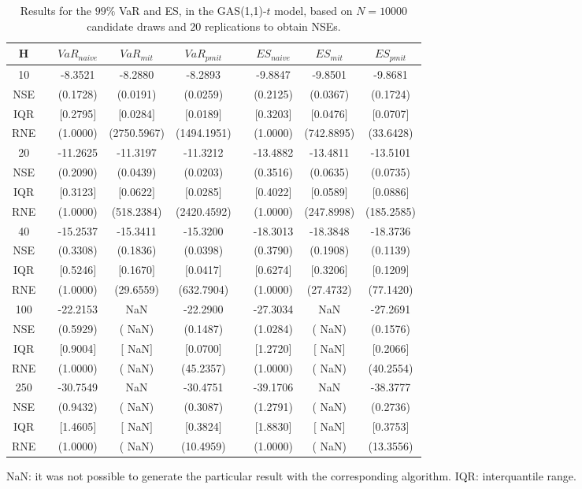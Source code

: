 \begin{table}[h] 
\centering 
\caption{Results for the $99\%$ VaR and ES, in the GAS(1,1)-$t$ model, based on $N=10000$ candidate draws and $20$ replications to obtain NSEs.} 
\label{tab:res_algos_t_gas_ML} 
\begin{tabular}{ccccccccc}  
 H & & $VaR_{naive}$ & $VaR_{mit}$ & $VaR_{pmit}$ &  & $ES_{naive}$ & $ES_{mit}$ & $ES_{pmit}$ \\ \hline 
10 & & -8.3521 & -8.2880 & -8.2893 & & -9.8847 & -9.8501 & -9.8681  \\ 
 NSE & & (0.1728) & (0.0191) & (0.0259) & & (0.2125) & (0.0367) & (0.1724)   \\ 
IQR & & $[$0.2795$]$ & $[$0.0284$]$ & $[$0.0189$]$ & & $[$0.3203$]$ & $[$0.0476$]$ & $[$0.0707$]$  \\  
 RNE & & (1.0000) & (2750.5967) & (1494.1951) & & (1.0000) & (742.8895) & (33.6428)   \\ [1ex] 
20 & & -11.2625 & -11.3197 & -11.3212 & & -13.4882 & -13.4811 & -13.5101  \\ 
 NSE & & (0.2090) & (0.0439) & (0.0203) & & (0.3516) & (0.0635) & (0.0735)   \\ 
IQR & & $[$0.3123$]$ & $[$0.0622$]$ & $[$0.0285$]$ & & $[$0.4022$]$ & $[$0.0589$]$ & $[$0.0886$]$  \\  
 RNE & & (1.0000) & (518.2384) & (2420.4592) & & (1.0000) & (247.8998) & (185.2585)   \\ [1ex] 
40 & & -15.2537 & -15.3411 & -15.3200 & & -18.3013 & -18.3848 & -18.3736  \\ 
 NSE & & (0.3308) & (0.1836) & (0.0398) & & (0.3790) & (0.1908) & (0.1139)   \\ 
IQR & & $[$0.5246$]$ & $[$0.1670$]$ & $[$0.0417$]$ & & $[$0.6274$]$ & $[$0.3206$]$ & $[$0.1209$]$  \\  
 RNE & & (1.0000) & (29.6559) & (632.7904) & & (1.0000) & (27.4732) & (77.1420)   \\ [1ex] 
100 & & -22.2153 &    NaN & -22.2900 & & -27.3034 &    NaN & -27.2691  \\ 
 NSE & & (0.5929) & (   NaN) & (0.1487) & & (1.0284) & (   NaN) & (0.1576)   \\ 
IQR & & $[$0.9004$]$ & $[$   NaN$]$ & $[$0.0700$]$ & & $[$1.2720$]$ & $[$   NaN$]$ & $[$0.2066$]$  \\  
 RNE & & (1.0000) & (   NaN) & (45.2357) & & (1.0000) & (   NaN) & (40.2554)   \\ [1ex] 
250 & & -30.7549 &    NaN & -30.4751 & & -39.1706 &    NaN & -38.3777  \\ 
 NSE & & (0.9432) & (   NaN) & (0.3087) & & (1.2791) & (   NaN) & (0.2736)   \\ 
IQR & & $[$1.4605$]$ & $[$   NaN$]$ & $[$0.3824$]$ & & $[$1.8830$]$ & $[$   NaN$]$ & $[$0.3753$]$  \\  
 RNE & & (1.0000) & (   NaN) & (10.4959) & & (1.0000) & (   NaN) & (13.3556)   \\ [1ex] 
\hline 
\end{tabular} 
\raggedright 

\vspace{5pt}\footnotesize{NaN: it was not possible to generate the particular result with the corresponding algorithm.} 
\vspace{5pt}\footnotesize{IQR: interquantile range.} 
\end{table} 
